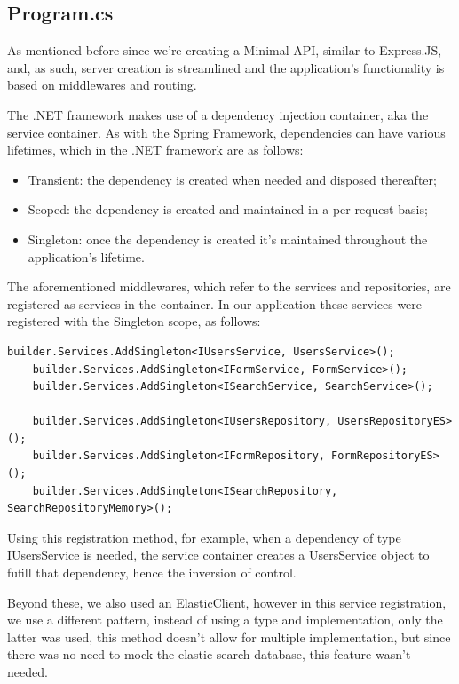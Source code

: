\subsection{Program.cs}

As mentioned before since we're creating a Minimal API, similar to Express.JS, and, as such, server creation is streamlined and the application's functionality is based on middlewares and routing.

The .NET framework makes use of a dependency injection container, aka the service container. As with the Spring Framework, dependencies can have various lifetimes, which in the .NET framework are as follows:
\begin{itemize}
	\item Transient: the dependency is created when needed and disposed thereafter;
	\item Scoped: the dependency is created and maintained in a per request basis;
	\item Singleton: once the dependency is created it's maintained throughout the application's lifetime. 
\end{itemize}

The aforementioned middlewares, which refer to the services and repositories, are registered as services in the container. In our application these services were registered with the Singleton scope, as follows:

\begin{lstlisting}[style=sharpc]
	builder.Services.AddSingleton<IUsersService, UsersService>();
	builder.Services.AddSingleton<IFormService, FormService>();
	builder.Services.AddSingleton<ISearchService, SearchService>();
	
	builder.Services.AddSingleton<IUsersRepository, UsersRepositoryES>();
	builder.Services.AddSingleton<IFormRepository, FormRepositoryES>();
	builder.Services.AddSingleton<ISearchRepository, SearchRepositoryMemory>();
\end{lstlisting}

Using this registration method, for example, when a dependency of type IUsersService is needed, the service container creates a UsersService object to fufill that dependency, hence the inversion of control.

Beyond these, we also used an ElasticClient, however in this service registration, we use a different pattern, instead of using a type and implementation, only the latter was used, this method doesn't allow for multiple implementation, but since there was no need to mock the elastic search database, this feature wasn't needed.

